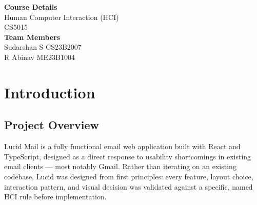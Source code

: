 \documentclass[12pt,a4paper]{report}
\begin{document}
\begin{titlepage}
\end{titlepage}

  \clearpage
  \thispagestyle{empty}
\pagecolor{dark}
\color{white}
\vspace*{\fill}
\begin{center}
  \begin{tcolorbox}[
    enhanced, sharp corners,
    colback=white!5!dark, colframe=white!15!dark,
    width=0.92\textwidth,
    left=60pt, right=60pt, top=60pt, bottom=60pt,
  ]
    \centering\color{white!80!dark}
    {\LARGE\bfseries\color{white} Course Details}\\[20pt]
    {\large\color{white!85!dark} Human Computer Interaction (HCI)}\\[10pt]
    {\large\color{white!55!dark} CS5015}\\[40pt]
    {\LARGE\bfseries\color{white} Team Members}\\[20pt]
    {\large\color{white!85!dark} Sudarshan S}\quad\quad
    {\large\color{white!45!dark} CS23B2007}\\[16pt]
    {\large\color{white!85!dark} R Abinav}\quad\quad
    {\large\color{white!45!dark} ME23B1004}
  \end{tcolorbox}
\end{center}
\vspace*{\fill}
\clearpage
\pagecolor{white}
\color{black}

\tableofcontents
\clearpage

\chapter{Introduction}

\section{Project Overview}

Lucid Mail is a fully functional email web application built with React and TypeScript,
designed as a direct response to usability shortcomings in existing email clients —
most notably Gmail. Rather than iterating on an existing codebase, Lucid was designed
from first principles: every feature, layout choice, interaction pattern, and visual
decision was validated against a specific, named HCI rule before implementation.
\end{document}
